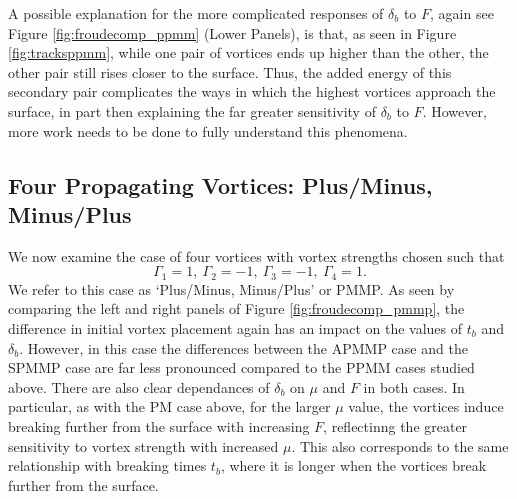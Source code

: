 \documentclass[a4paper,11pt]{article}
\begin{document}
A possible explanation for the more complicated responses of $\delta_{b}$ to $F$, again see Figure \ref{fig:froudecomp_ppmm} (Lower Panels), is that, as seen in Figure \ref{fig:tracksppmm}, while one pair of vortices ends up higher than the other, the other pair still rises closer to the surface.  Thus, the added energy of this secondary pair complicates the ways in which the highest vortices approach the surface, in part then explaining the far greater sensitivity of $\delta_{b}$ to $F$.  However, more work needs to be done to fully understand this phenomena.  

\subsection{Four Propagating Vortices: Plus/Minus, Minus/Plus}
We now examine the case of four vortices with vortex strengths chosen such that
\[
\Gamma_{1}=1, ~ \Gamma_{2}=-1, ~ \Gamma_{3}=-1,~\Gamma_{4}=1.
\]
We refer to this case as `Plus/Minus, Minus/Plus' or PMMP.  As seen by comparing the left and right panels of Figure \ref{fig:froudecomp_pmmp}, the difference in initial vortex placement again has an impact on the values of $t_{b}$ and $\delta_{b}$.  However, in this case the differences between the APMMP case and the SPMMP case are far less pronounced compared to the PPMM cases studied above.  There are also clear dependances of $\delta_{b}$ on $\mu$ and $F$ in both cases.  In particular, as with the PM case above, for the larger $\mu$ value, the vortices induce breaking further from the surface with increasing $F$, reflectinng the greater sensitivity to vortex strength with increased $\mu$.  This also corresponds to the same relationship with breaking times $t_{b}$, where it is longer when the vortices break further from the surface.  
\end{document}
